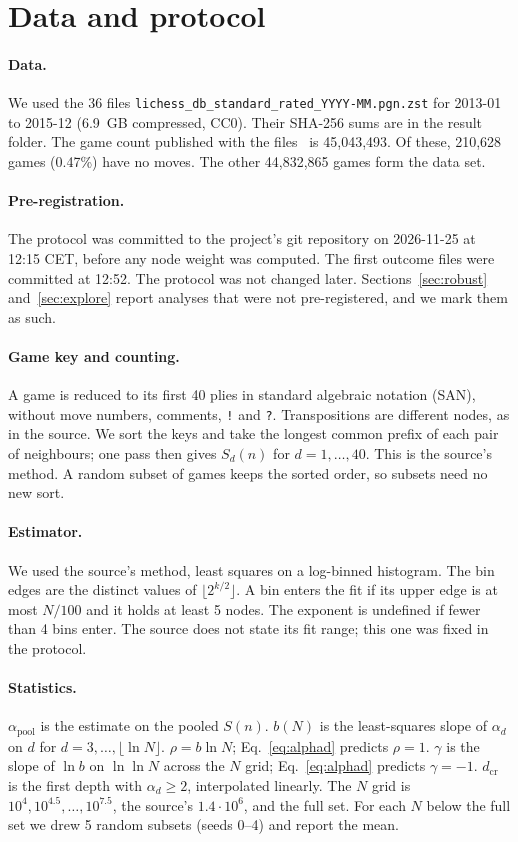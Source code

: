 \documentclass[11pt]{article}
\begin{document}
\section{Data and protocol}
\paragraph{Data.} We used the 36 files \texttt{lichess\_db\_standard\_rated\_YYYY-MM.pgn.zst} for 2013-01 to 2015-12 (6.9~GB compressed, CC0). Their SHA-256 sums are in the result folder. The game count published with the files~\cite{lichess} is 45,043,493. Of these, 210,628 games (0.47\%) have no moves. The other 44,832,865 games form the data set.

\paragraph{Pre-registration.} The protocol was committed to the project's git repository on 2026-11-25 at 12:15 CET, before any node weight was computed. The first outcome files were committed at 12:52. The protocol was not changed later. Sections~\ref{sec:robust} and~\ref{sec:explore} report analyses that were not pre-registered, and we mark them as such.

\paragraph{Game key and counting.} A game is reduced to its first 40 plies in standard algebraic notation (SAN), without move numbers, comments, \texttt{!} and \texttt{?}. Transpositions are different nodes, as in the source. We sort the keys and take the longest common prefix of each pair of neighbours; one pass then gives $S_d(n)$ for $d=1,\dots,40$. This is the source's method. A random subset of games keeps the sorted order, so subsets need no new sort.

\paragraph{Estimator.} We used the source's method, least squares on a log-binned histogram. The bin edges are the distinct values of $\lfloor2^{k/2}\rfloor$. A bin enters the fit if its upper edge is at most $N/100$ and it holds at least 5 nodes. The exponent is undefined if fewer than 4 bins enter. The source does not state its fit range; this one was fixed in the protocol.

\paragraph{Statistics.} $\alpha_{\mathrm{pool}}$ is the estimate on the pooled $S(n)$. $b(N)$ is the least-squares slope of $\alpha_d$ on $d$ for $d=3,\dots,\lfloor\ln N\rfloor$. $\rho=b\ln N$; Eq.~\eqref{eq:alphad} predicts $\rho=1$. $\gamma$ is the slope of $\ln b$ on $\ln\ln N$ across the $N$ grid; Eq.~\eqref{eq:alphad} predicts $\gamma=-1$. $d_{\mathrm{cr}}$ is the first depth with $\alpha_d\ge2$, interpolated linearly. The $N$ grid is $10^4, 10^{4.5},\dots,10^{7.5}$, the source's $1.4\cdot10^6$, and the full set. For each $N$ below the full set we drew 5 random subsets (seeds 0--4) and report the mean.
\end{document}
